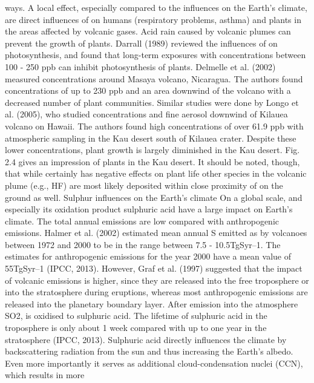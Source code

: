 \documentclass  [
  paper    = a4,
  BCOR     = 10mm,
  twoside,
  fontsize = 12pt,
  fleqn,
  toc      = bibnumbered,
  toc      = listofnumbered,
  numbers  = noendperiod,
  headings = normal,
  listof   = leveldown,
  version  = 3.03
]                                       {scrreprt}
\begin{document}
	ways. A local effect, especially
	compared to the influences on the
	Earth’s climate, are direct influences
	of  on humans (respiratory problems,
	asthma) and plants in the areas
	affected by volcanic gases. Acid rain
	caused by volcanic plumes can prevent
	the growth of plants. Darrall (1989)
	reviewed the influences of  on photosynthesis,
	and found that long-term
	exposures with  concentrations between
	100 - 250 ppb can inhibit photosynthesis
	of plants. Delmelle et al.
	(2002) measured  concentrations
	around Masaya volcano, Nicaragua.
	The authors found concentrations of
	up to 230 ppb and an area downwind
	of the volcano with a decreased number
	of plant communities. Similar
	studies were done by Longo et al.
	(2005), who studied  concentrations
	and fine aerosol downwind of Kilauea
	volcano on Hawaii. The authors
	found high  concentrations of over
	61.9 ppb with atmospheric sampling in the Kau desert south of Kilauea crater.
	Despite these lower  concentrations, plant growth is largely diminished in the
	Kau desert. Fig. 2.4 gives an impression of plants in the Kau desert. It should be
	noted, though, that while  certainly has negative effects on plant life other
	species in the volcanic plume (e.g., HF) are most likely deposited within close
	proximity of  on the ground as well.
	Sulphur influences on the Earth’s climate
	On a global scale,  and especially its oxidation product sulphuric acid have
	a large impact on Earth’s climate. The total annual  emissions are low
	compared with anthropogenic emissions. Halmer et al. (2002) estimated mean
	annual S emitted as  by volcanoes between 1972 and 2000 to be in the range
	between 7.5 - 10.5TgSyr–1. The estimates for anthropogenic  emissions for
	the year 2000 have a mean value of 55TgSyr–1 (IPCC, 2013). However, Graf et al.
	(1997) suggested that the impact of volcanic  emissions is higher, since they
	are released into the free troposphere or into the stratosphere during eruptions,
	whereas most anthropogenic emissions are released into the planetary boundary
	layer. After emission into the atmosphere SO2, is oxidised to sulphuric acid. The
	lifetime of sulphuric acid in the troposphere is only about 1 week compared with
	up to one year in the stratosphere (IPCC, 2013).
	Sulphuric acid directly influences the climate by backscattering radiation
	from the sun and thus increasing the Earth’s albedo. Even more importantly
	it serves as additional cloud-condensation nuclei (CCN), which results in more
\end{document}
